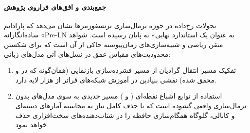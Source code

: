 \paragraph*{جمع‌بندی و افق‌های فراروی پژوهش}
تحولات رخ‌داده در حوزه نرمال‌سازی ترنسفورمرها نشان می‌دهد که پارادایم ساده‌انگارانه «Pre-LN به عنوان یک استاندارد نهایی» به پایان رسیده است. شواهد متقن ریاضی و شبیه‌سازی‌های زمان‌پیوسته حاکی از آن است که برای شکستن محدودیت‌های مقیاس عمق در نسل‌های آتی مدل‌های زبانی:
\begin{enumerate}
    \item تفکیک مسیر انتقال گرادیان از مسیر فشرده‌سازی بازنمایی (همان‌گونه که در  و  محقق شده) نقشی بنیادین در آموزش شبکه‌های فراتر از هزار لایه دارد.
    \item استفاده از توابع اشباع نقطه‌ای ( و ) مسیر جدیدی به سوی مدل‌های بدون نرمال‌سازی واقعی گشوده است که با حذف کامل نیاز به محاسبه آمارهای دسته‌ای و کانالی، گلوگاه همگام‌سازی حافظه را در شتاب‌دهنده‌های سخت‌افزاری حذف خواهد نمود.
\end{enumerate}